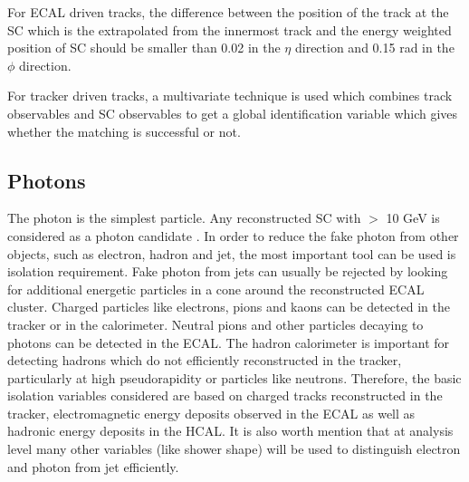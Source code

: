 For ECAL driven tracks, the difference between the position of the track at the SC which is the extrapolated from the innermost track and the energy weighted position of SC should be smaller than 0.02 in the $\eta$ direction and 0.15 rad in the $\phi$ direction.

For tracker driven tracks, a multivariate technique is used which combines track observables and SC observables to get a global identification variable which gives whether the matching is successful or not.



\subsection{Photons}\label{subsec:photon_reco}
The photon is the simplest particle. Any reconstructed SC with \pt $>$ 10 GeV is considered as a photon candidate \cite{Soffi2016}. In order to reduce the fake photon from other objects, such as electron, hadron and jet, the most important tool can be used is isolation requirement. Fake photon from jets can usually be rejected by looking for additional energetic particles in a cone around the reconstructed ECAL cluster. Charged particles like electrons, pions and kaons can be detected in the tracker or in the calorimeter. Neutral pions and other particles decaying to photons can be detected in the ECAL. The hadron calorimeter is important for detecting hadrons which do not efficiently reconstructed in the tracker, particularly at high pseudorapidity or particles like neutrons. Therefore, the basic isolation variables considered are based on charged tracks reconstructed in the tracker, electromagnetic energy deposits observed in the ECAL as well as hadronic energy deposits in the HCAL.
It is also worth mention that at analysis level many other variables (like shower shape) will be used to distinguish electron and photon from jet efficiently.

